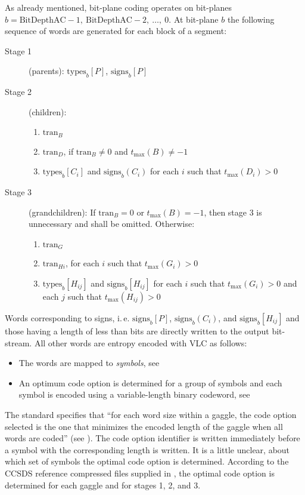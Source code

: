 As already mentioned, bit-plane coding operates on bit-planes $b=\mathrm{BitDepthAC}-1,\ \mathrm{BitDepthAC}-2,\ \ldots,\ 0$. At bit-plane $b$ the following sequence of words are generated for each block of a segment:
\begin{description}
  \item[Stage 1] (parents): $\mathrm{types}_b[P]$, $\mathrm{signs}_b[P]$
  \item[Stage 2] (children):
      \begin{enumerate}
        \item $\mathrm{tran}_B$
        \item $\mathrm{tran}_D$, if $\mathrm{tran}_B\neq 0$ and $t_\mathrm{max}(B)\neq -1$
        \item $\mathrm{types}_b[C_i]$ and $\mathrm{signs}_b(C_i)$ for each $i$ such that $t_\mathrm{max}(D_i)>0$
      \end{enumerate}
  \item[Stage 3] (grandchildren): If $\mathrm{tran}_B=0$ or $t_\mathrm{max}(B)=-1$, then stage 3 is unnecessary and shall be omitted. Otherwise:
      \begin{enumerate}
        \item $\mathrm{tran}_G$
        \item $\mathrm{tran}_{Hi}$, for each $i$ such that $t_\mathrm{max}(G_i)>0$
        \item $\mathrm{types}_b[H_{ij}]$ and $\mathrm{signs}_b[H_{ij}]$ for each $i$ such that $t_\mathrm{max}(G_i)>0$ and each $j$ such that $t_\mathrm{max}(H_{ij})>0$
      \end{enumerate}
\end{description}
Words corresponding to signs, i.\,e. $\mathrm{signs}_b[P]$, $\mathrm{signs}_b(C_i)$, and $\mathrm{signs}_b[H_{ij}]$ and those having a length of less than \unit[2]{bits} are directly written to the output bit-stream. All other words are entropy encoded with \gls{VLC} as follows:
\begin{itemize}
  \item The words are mapped to \textit{symbols}, see \cite[p.~4-30]{CCSDS122blue}
  \item An optimum code option is determined for a group of symbols and each symbol is encoded using a variable-length binary codeword, see \cite[p.~4-31]{CCSDS122blue}
\end{itemize}
The standard specifies that ``for each word size within a gaggle, the code option selected is the one that minimizes the encoded length of the gaggle when all words are coded'' (see \cite[p.~4-32]{CCSDS122blue}). The code option identifier is written immediately before a symbol with the corresponding length is written. It is a little unclear, about which set of symbols the optimal code option is determined. According to the CCSDS reference compressed files supplied in \cite{CCSDS122ref}, the optimal code option is determined for each gaggle and for stages 1, 2, and 3.

